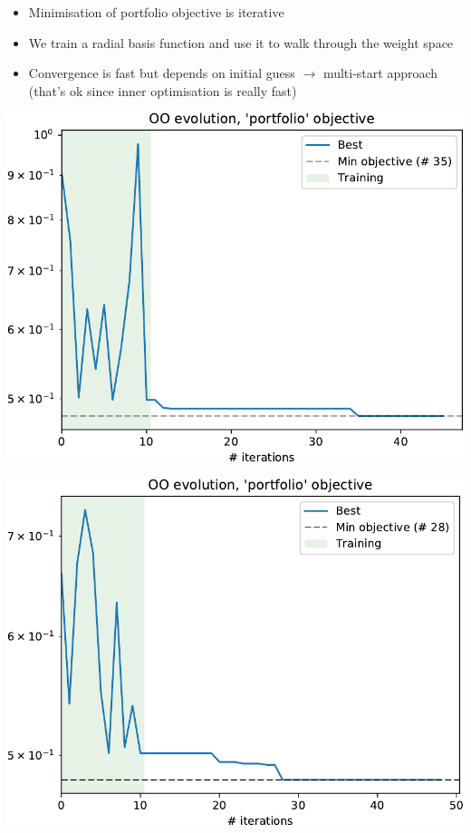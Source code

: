     \begin{itemize}
        \item Minimisation of portfolio objective is iterative
        \item We train a radial basis function and use it to walk through the weight space
        \item Convergence is fast but depends on initial guess $\to$ multi-start approach (that's ok since inner optimisation is really fast)
    \end{itemize}
    \begin{minipage}{.48\textwidth}%
        \begin{center}
            \includegraphics[width=.98\textwidth]{oo/chain-3-report.pdf}
        \end{center}
    \end{minipage}%
    \begin{minipage}{.04\textwidth}%
    \end{minipage}%
    \begin{minipage}{.48\textwidth}%
        \begin{center}
            \includegraphics[width=.98\textwidth]{oo/chain-1-report.pdf}
        \end{center}
    \end{minipage}%

